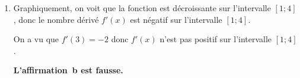 \documentclass[10pt]{article}
\begin{document}
\begin{enumerate}
\begin{enumerate}
	Sur l'intervalle $[-3 ; 5]$,\quad $0,5x + 1,5 \geqslant 0$ \quad  et \quad $-x+5 \geqslant 0$

	donc le produit \quad $(0,5x + 1,5)(-x+5)$ \quad est positif.

	\textbf{L'affirmation~a est fausse.}

	\item Graphiquement, on voit que la fonction est décroissante sur l'intervalle $[1 ; 4]$, donc le nombre dérivé $f'(x)$ est négatif sur l'intervalle $[1 ; 4]$.

	On a vu que \quad $f'(3) = -2$ \quad donc $f'(x)$ n'est pas positif sur l'intervalle $[1 ; 4]$.

	\textbf{L'affirmation~b est fausse.}
	\end{enumerate}
\end{enumerate}
\end{document}
